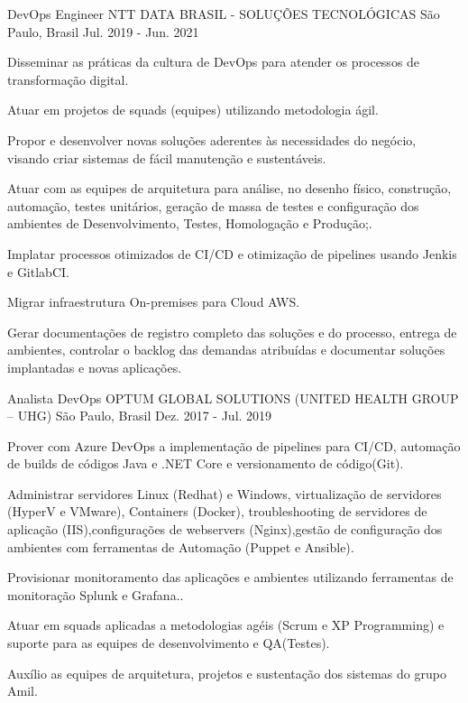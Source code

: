\begin{cventries}
  \cventry
    {DevOps Engineer} %
    {NTT DATA BRASIL - SOLUÇÕES TECNOLÓGICAS} %
    {São Paulo, Brasil} %
    {Jul. 2019 - Jun. 2021} %
    {
      \begin{cvitems} %
        \item {Disseminar as práticas da cultura de DevOps para atender os processos de transformação digital.}
        \item {Atuar em projetos de squads (equipes) utilizando metodologia ágil.}
        \item {Propor e desenvolver novas soluções aderentes às necessidades do negócio, visando criar sistemas de fácil manutenção e sustentáveis.}
        \item {Atuar com as equipes de arquitetura para análise, no desenho físico, construção, automação, testes unitários, geração de massa de testes e configuração dos ambientes de Desenvolvimento, Testes, Homologação e Produção;.}
        \item {Implatar processos otimizados de CI/CD e otimização de pipelines usando Jenkis e GitlabCI.}
        \item {Migrar infraestrutura On-premises para Cloud AWS.}
        \item {Gerar documentações de registro completo das soluções e do processo, entrega de ambientes, controlar o backlog das demandas atribuídas e documentar soluções implantadas e novas aplicações.}
      \end{cvitems}
    }

  \cventry
    {Analista DevOps} %
    {OPTUM GLOBAL SOLUTIONS (UNITED HEALTH GROUP – UHG)} %
    {São Paulo, Brasil} %
    {Dez. 2017 - Jul. 2019} %
    {
      \begin{cvitems} %
        \item {Prover com  Azure DevOps a implementação de pipelines para CI/CD, automação de builds de códigos Java e .NET Core e versionamento de código(Git).}
        \item {Administrar servidores Linux (Redhat) e Windows, virtualização de servidores (HyperV e VMware), Containers (Docker), troubleshooting de servidores de aplicação (IIS),configurações de webservers (Nginx),gestão de configuração dos ambientes com ferramentas de Automação (Puppet e Ansible).}
        \item {Provisionar monitoramento das aplicações e ambientes utilizando ferramentas de monitoração Splunk e Grafana..}
        \item {Atuar em squads aplicadas a metodologias agéis (Scrum e XP Programming) e suporte para as equipes de desenvolvimento e QA(Testes).}
        \item {Auxílio as equipes de arquitetura, projetos e sustentação dos sistemas do grupo Amil.}
      \end{cvitems}
    }


\end{cventries}
